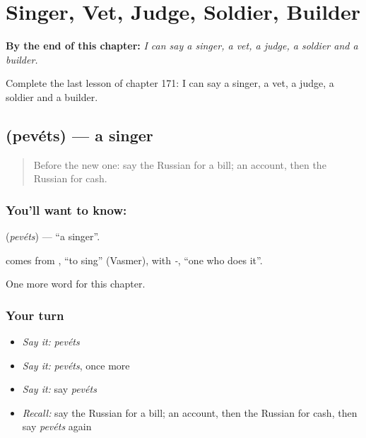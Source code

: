 
\chapter{Singer, Vet, Judge, Soldier, Builder}
\label{ch:ru-singer-vet-judge-soldier-builder}

\begin{chapteropening}
\textbf{By the end of this chapter:} \emph{I can say a singer, a vet, a judge, a soldier and a builder.}

Complete the last lesson of chapter 171: I can say a singer, a vet, a judge, a soldier and a builder.
\end{chapteropening}

\section[\texorpdfstring{\ru{певец} (pevéts)}{певец (pevéts)}]{ (pevéts) — a singer}

\label{lesson:RU-C171-pevets}



\begin{quote}
Before the new one: say the Russian for a bill; an account, then the Russian for cash.
\end{quote}

\subsection*{You'll want to know: }
\textbf{} (\emph{pevéts}) — \textquotedblleft{}a singer\textquotedblright{}.

\begin{cousinweb}
\textbf{} comes from \emph{}, \textquotedblleft{}to sing\textquotedblright{} (Vasmer), with \emph{-}, \textquotedblleft{}one who does it\textquotedblright{}.
\end{cousinweb}

\begin{grammarlens}[title={What you've built}]
One more word for this chapter.
\end{grammarlens}

\subsection*{Your turn}
\begin{itemize}
\raggedright
  \item \emph{Say it:} \emph{pevéts}
  \item \emph{Say it:} \emph{pevéts}, once more
  \item \emph{Say it:} say \emph{pevéts}
  \item \emph{Recall:} say the Russian for a bill; an account, then the Russian for cash, then say \emph{pevéts} again
\end{itemize}

